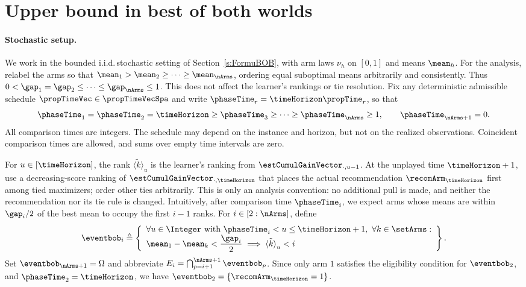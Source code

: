 %
\section{Upper bound in best of both worlds} %
\label{app:proofupBOB}
%
\paragraph{Stochastic setup.}
We work in the bounded i.i.d.\,stochastic setting of
Section~\ref{s:FormuBOB}, with arm laws $\nu_h$ on $[0,1]$ and
means $\mean_h$. For the analysis, relabel the arms so that
$\mean_1>\mean_2\geq\cdots\geq\mean_{\nArms}$, ordering equal
suboptimal means arbitrarily and consistently. Thus
$0<\gap_1=\gap_2\leq\cdots\leq\gap_{\nArms}\leq1$.
This does not affect the learner's rankings or tie resolution.
Fix any deterministic admissible schedule
$\propTimeVec\in\propTimeVecSpa$ and write
$\phaseTime_r=\timeHorizon\propTime_r$, so that
\[
\phaseTime_1=\phaseTime_2=\timeHorizon
\geq\phaseTime_3\geq\cdots\geq\phaseTime_{\nArms}\geq1,
\qquad \phaseTime_{\nArms+1}=0.
\]
All comparison times are integers. The schedule may depend on the
instance and horizon, but not on the realized observations.
Coincident comparison times are allowed, and sums over empty time
intervals are zero.

For $u\in[\timeHorizon]$, the rank $\tilde{\langle k\rangle}_u$
is the learner's ranking from $\estCumulGainVector_{\cdot,u-1}$.
At the unplayed time $\timeHorizon+1$, use a decreasing-score ranking
of $\estCumulGainVector_{\cdot,\timeHorizon}$ that places the actual
recommendation $\recomArm_{\timeHorizon}$ first among tied maximizers;
order other ties arbitrarily. This is only an analysis convention:
no additional pull is made, and neither the recommendation nor its
tie rule is changed.
Intuitively, after comparison time $\phaseTime_i$, we expect arms
whose means are within $\gap_i/2$ of the best mean to occupy the
first $i-1$ ranks. For $i\in[2:\nArms]$, define
\begin{equation}\label{eq:eventbob}
\eventbob_i
\triangleq
\left\{
\begin{array}{l}
\forall u\in\Integer\text{ with }\phaseTime_i<u\leq\timeHorizon+1,
\ \forall k\in\setArms:\\
\displaystyle
\mean_1-\mean_k<\frac{\gap_i}{2}
\implies\tilde{\langle k\rangle}_u<i
\end{array}
\right\}.
\end{equation}
Set $\eventbob_{\nArms+1}=\Omega$ and abbreviate
$E_i=\bigcap_{p=i+1}^{\nArms+1}\eventbob_p$.
Since only arm $1$ satisfies the eligibility condition for
$\eventbob_2$, and $\phaseTime_2=\timeHorizon$, we have
$\eventbob_2=\{\recomArm_{\timeHorizon}=1\}$.

